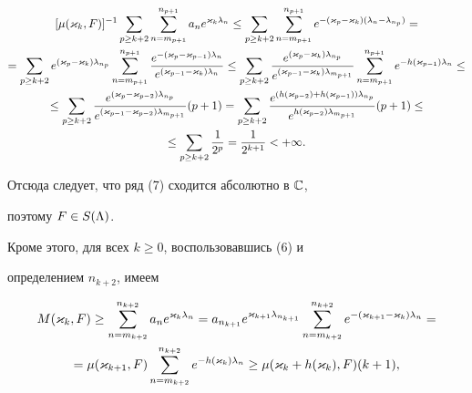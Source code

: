 \begin{gather*}


[\mu(\k_k,F)]^{-1}\sum_{p\ge k+2}\sum_{n=m_{p+1}}^{n_{p+1}}a_ne^{\k_k\l_n}\le


\sum_{p\ge k+2}\sum_{n=m_{p+1}}^{n_{p+1}}e^{-(\k_p-\k_k)(\l_n-\l_{n_p})}=\\


%


=\sum_{p\ge k+2}e^{(\k_p-\k_k)\l_{n_p}}


\sum_{n=m_{p+1}}^{n_{p+1}}\frac{e^{-(\k_p-\k_{p-1})\l_n}}


{e^{(\k_{p-1}-\k_k)\l_n}}\le


\sum_{p\ge k+2}


\frac{e^{(\k_p-\k_k)\l_{n_p}}}{e^{(\k_{p-1}-\k_k)\l_{m_{p+1}}}}


\sum_{n=m_{p+1}}^{n_{p+1}}e^{-h(\k_{p-1})\l_n}\le \\


%


\le \sum_{p\ge k+2}


\frac{e^{(\k_p-\k_{p-2})\l_{n_p}}}{e^{(\k_{p-1}-\k_{p-2})\l_{m_{p+1}}}}


(p+1)=\sum_{p\ge k+2}


\frac{e^{(h(\k_{p-2})+h(\k_{p-1}))\l_{n_p}}}{e^{h(\k_{p-2})\l_{m_{p+1}}}}


(p+1)\le\\


\le\sum_{p\ge k+2}\frac1{2^p}=\frac1{2^{k+1}}<+\i.


\end{gather*}


Отсюда следует, что ряд (7) сходится абсолютно в ${\Bbb C}$,


поэтому $F\in S(\Lambda)$.





Кроме этого, для всех $k\ge 0$, воспользовавшись (6) и


определением $n_{k+2}$, имеем


\begin{gather*}


M(\k_k,F)\ge \sum_{n=m_{k+2}}^{n_{k+2}}a_ne^{\k_k\l_n}=


a_{n_{k+1}}e^{\k_{k+1}\l_{n_{k+1}}}\sum_{n=m_{k+2}}^{n_{k+2}}


e^{-(\k_{k+1}-\k_k)\l_n}=\\


=\mu(\k_{k+1},F)\sum_{n=m_{k+2}}^{n_{k+2}}


e^{-h(\k_k)\l_n}\ge\mu(\k_k+h(\k_k),F)(k+1),


\end{gather*}


